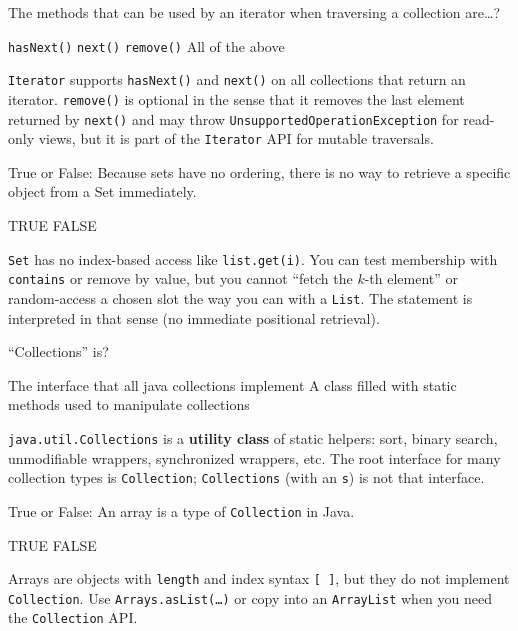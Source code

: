 \question[4]
The methods that can be used by an iterator when traversing a collection are\ldots?
\begin{choices}
  \choice \texttt{hasNext()}
  \choice \texttt{next()}
  \choice \texttt{remove()}
  \CorrectChoice All of the above
\end{choices}
\begin{solution}
  \texttt{Iterator} supports \texttt{hasNext()} and \texttt{next()} on all collections that return an iterator. \texttt{remove()} is optional in the sense that it removes the last element returned by \texttt{next()} and may throw \texttt{UnsupportedOperationException} for read-only views, but it is part of the \texttt{Iterator} API for mutable traversals.
\end{solution}

\question[4]
True or False: Because sets have no ordering, there is no way to retrieve a specific object from a Set immediately.
\begin{choices}
  \CorrectChoice TRUE
  \choice FALSE
\end{choices}
\begin{solution}
  \texttt{Set} has no index-based access like \texttt{list.get(i)}. You can test membership with \texttt{contains} or remove by value, but you cannot ``fetch the $k$-th element'' or random-access a chosen slot the way you can with a \texttt{List}. The statement is interpreted in that sense (no immediate positional retrieval).
\end{solution}


\newpage

\question[4]
``Collections'' is?
\begin{choices}
  \choice The interface that all java collections implement
  \CorrectChoice A class filled with static methods used to manipulate collections
\end{choices}
\begin{solution}
  \texttt{java.util.Collections} is a \textbf{utility class} of static helpers: sort, binary search, unmodifiable wrappers, synchronized wrappers, etc. The root interface for many collection types is \texttt{Collection}; \texttt{Collections} (with an \texttt{s}) is not that interface.
\end{solution}

\question[4]
True or False: An array is a type of \texttt{Collection} in Java.
\begin{choices}
  \choice TRUE
  \CorrectChoice FALSE
\end{choices}
\begin{solution}
  Arrays are objects with \texttt{length} and index syntax \texttt{[ ]}, but they do not implement \texttt{Collection}. Use \texttt{Arrays.asList(\ldots)} or copy into an \texttt{ArrayList} when you need the \texttt{Collection} API.
\end{solution}


